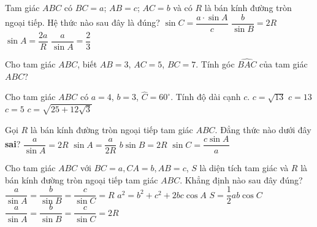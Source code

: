 \begin{ex}%
	Tam giác $ABC$ có $BC=a$; $AB=c$; $AC=b$ và  có $R$ là bán kính đường tròn ngoại tiếp. Hệ thức nào sau đây là đúng?
	\choice 
		{$\sin C=\dfrac{a \cdot \sin A}{c}$} 
		 {\True $\dfrac{b}{\sin B}=2 R$}
		{$\sin A=\dfrac{2a}{R}$} 
		{$\dfrac{a}{\sin A}=\dfrac{2}{3}$} 
\end{ex}

\begin{ex}%
	Cho tam giác $ABC$, biết $AB=3$, $AC=5$,  $BC=7$. Tính góc $\widehat{BAC}$ của tam giác $ABC$?
\end{ex}

\begin{ex}%
	Cho tam  giác $ABC$ có $a=4$, $b=3$, $\widehat C=60^\circ$. Tính độ dài cạnh $c$.
	\choice 
		 {\True $c=\sqrt{13}$}
		 {$c=13$}
		 {$c=5$}
		{$c=\sqrt{25+12\sqrt  3}$}
\end{ex}

\begin{ex}%
	 Gọi $R$ là bán kính đường tròn ngoại tiếp tam giác $ABC$. Đẳng thức nào dưới đây \textbf{sai}?
	\choice 
		 {$\dfrac{a}{\sin A}=2R$}
		 {$\sin A=\dfrac{a}{2R}$}
		{\True $b\sin B=2R$} 
		{$\sin C=\dfrac{c\sin A}{a} $} 
\end{ex}

\begin{ex}%
	Cho tam giác $ABC$ với $BC=a, CA=b, AB=c$, $S$ là diện tích tam giác và $R$ là bán kính đường tròn ngoại tiếp  tam giác $ABC$. Khẳng định nào sau đây đúng?
	 \choice
		{$\dfrac{a}{\sin  A}=\dfrac{b}{\sin B}=\dfrac{c}{\sin C}=R$}
		 {$a^2=b^2+c^2+2bc\cos A$}
		{$S=\dfrac{1}{2}ab\cos  C$}
		{\True $\dfrac{a}{\sin A}=\dfrac{b}{\sin B}=\dfrac{c}{\sin  C}=2R$}
\end{ex}

